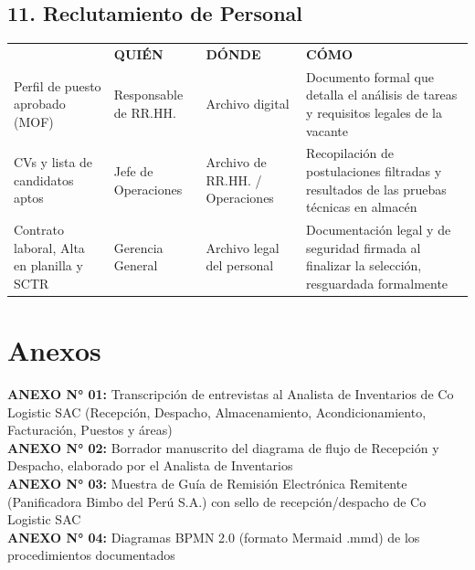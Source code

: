 \documentclass[11pt,letterpaper]{report}
\begin{document}
\vspace{2em}

\section*{11. Reclutamiento de Personal}
\begin{tabularx}{\textwidth}{>{\raggedright\arraybackslash}X >{\raggedright\arraybackslash}p{} >{\raggedright\arraybackslash}p{} >{\raggedright\arraybackslash}X}
\toprule
\multirow{2}{*}{\textbf{DOCUMENTO (QUÉ)}} & \multicolumn{3}{c}{\textbf{CUSTODIA}} \\
\cmidrule{2-4}
& \textbf{QUIÉN} & \textbf{DÓNDE} & \textbf{CÓMO} \\
\midrule
Perfil de puesto aprobado (MOF) & Responsable de RR.HH. & Archivo digital & Documento formal que detalla el análisis de tareas y requisitos legales de la vacante \\
\midrule
CVs y lista de candidatos aptos & Jefe de Operaciones & Archivo de RR.HH. / Operaciones & Recopilación de postulaciones filtradas y resultados de las pruebas técnicas en almacén \\
\midrule
Contrato laboral, Alta en planilla y SCTR & Gerencia General & Archivo legal del personal & Documentación legal y de seguridad firmada al finalizar la selección, resguardada formalmente \\
\bottomrule
\end{tabularx}

\vspace{2em}

\chapter{Anexos}
\textbf{ANEXO N° 01:} Transcripción de entrevistas al Analista de Inventarios de Co Logistic SAC (Recepción, Despacho, Almacenamiento, Acondicionamiento, Facturación, Puestos y áreas) \\
\textbf{ANEXO N° 02:} Borrador manuscrito del diagrama de flujo de Recepción y Despacho, elaborado por el Analista de Inventarios \\
\textbf{ANEXO N° 03:} Muestra de Guía de Remisión Electrónica Remitente (Panificadora Bimbo del Perú S.A.) con sello de recepción/despacho de Co Logistic SAC \\
\textbf{ANEXO N° 04:} Diagramas BPMN 2.0 (formato Mermaid .mmd) de los procedimientos documentados
\end{document}
